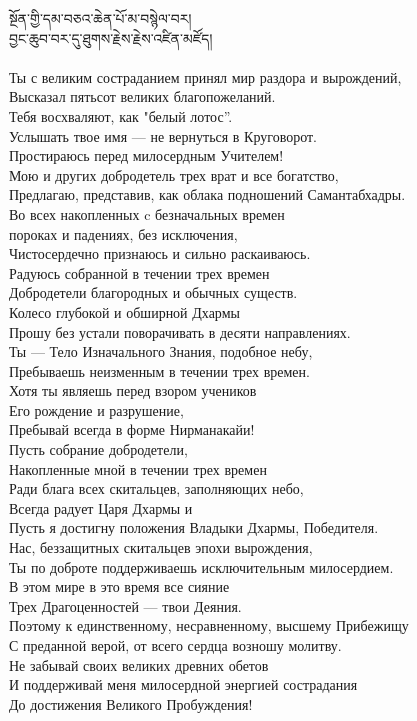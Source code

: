 སྔོན་གྱི་དམ་བཅའ་ཆེན་པོ་མ་བསྙེལ་བར།\\
བྱང་ཆུབ་བར་དུ་ཐུགས་རྗེས་རྗེས་འཛིན་མཛོད།\\
\\
\ru
Ты с великим состраданием принял мир раздора и вырождений,\\
Высказал пятьсот великих благопожеланий.\\
Тебя восхваляют, как "белый лотос”. \\
Услышать твое имя  — не вернуться в Круговорот.\\
Простираюсь перед милосердным Учителем!\\
Мою и других добродетель трех врат и все богатство,\\
Предлагаю, представив, как облака подношений Самантабхадры.\\
Во всех накопленных c безначальных времен\\
пороках и падениях, без исключения,\\
Чистосердечно признаюсь и сильно раскаиваюсь.\\
Радуюсь собранной в течении трех времен\\
Добродетели благородных и обычных существ.\\
Колесо глубокой и обширной Дхармы\\
Прошу без устали поворачивать в десяти направлениях.\\
Ты — Тело Изначального Знания, подобное небу,\\
Пребываешь неизменным в течении трех времен.\\
Хотя ты являешь перед взором учеников\\
Его рождение и разрушение,\\
Пребывай всегда в форме Нирманакайи!\\
Пусть собрание добродетели,\\
Накопленные мной в течении трех времен\\
Ради блага всех скитальцев, заполняющих небо,\\
Всегда радует Царя Дхармы и\\
Пусть я достигну положения Владыки Дхармы, Победителя.\\
Нас, беззащитных скитальцев эпохи вырождения,\\
Ты по доброте поддерживаешь исключительным милосердием.\\
В этом мире в это время все сияние\\
Трех Драгоценностей — твои Деяния.\\
Поэтому к единственному, несравненному, высшему Прибежищу\\
С преданной верой, от всего сердца возношу молитву.\\
Не забывай своих великих древних обетов\\
И поддерживай меня милосердной энергией сострадания\\
До достижения Великого Пробуждения!\\
\\
\newpage
